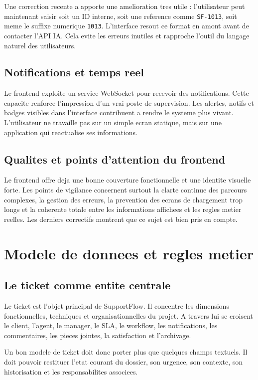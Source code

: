 \documentclass[12pt,a4paper,oneside]{report}
\begin{document}
Une correction recente a apporte une amelioration tres utile : l'utilisateur peut maintenant saisir soit un ID interne, soit une reference comme \texttt{SF-1013}, soit meme le suffixe numerique \texttt{1013}. L'interface resout ce format en amont avant de contacter l'API IA. Cela evite les erreurs inutiles et rapproche l'outil du langage naturel des utilisateurs.

\section{Notifications et temps reel}

Le frontend exploite un service WebSocket pour recevoir des notifications. Cette capacite renforce l'impression d'un vrai poste de supervision. Les alertes, notifs et badges visibles dans l'interface contribuent a rendre le systeme plus vivant. L'utilisateur ne travaille pas sur un simple ecran statique, mais sur une application qui reactualise ses informations.

\section{Qualites et points d'attention du frontend}

Le frontend offre deja une bonne couverture fonctionnelle et une identite visuelle forte. Les points de vigilance concernent surtout la clarte continue des parcours complexes, la gestion des erreurs, la prevention des ecrans de chargement trop longs et la coherente totale entre les informations affichees et les regles metier reelles. Les derniers correctifs montrent que ce sujet est bien pris en compte.

\chapter{Modele de donnees et regles metier}

\section{Le ticket comme entite centrale}

Le ticket est l'objet principal de SupportFlow. Il concentre les dimensions fonctionnelles, techniques et organisationnelles du projet. A travers lui se croisent le client, l'agent, le manager, le SLA, le workflow, les notifications, les commentaires, les pieces jointes, la satisfaction et l'archivage.

Un bon modele de ticket doit donc porter plus que quelques champs textuels. Il doit pouvoir restituer l'etat courant du dossier, son urgence, son contexte, son historisation et les responsabilites associees.
\end{document}
